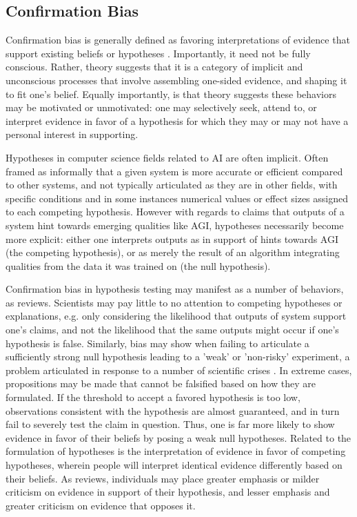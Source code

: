 \documentclass{article}
\theoremstyle{plain}
\theoremstyle{definition}
\theoremstyle{remark}
\begin{document}
\subsection{Confirmation Bias}

Confirmation bias is generally defined as favoring interpretations of evidence that support existing beliefs or hypotheses \cite{nickerson1998confirmation}. Importantly, it need not be fully conscious. Rather, theory suggests that it is a category of implicit and unconscious processes that involve assembling one-sided evidence, and shaping it to fit one's belief. Equally importantly, is that theory suggests these behaviors may be motivated or unmotivated: one may selectively seek, attend to, or interpret evidence in favor of a hypothesis for which they may or may not have a personal interest in supporting. 

Hypotheses in computer science fields related to AI are often implicit. Often framed as informally that a given system is more accurate or efficient compared to other systems, and not typically articulated as they are in other fields, with specific conditions and in some instances numerical values or effect sizes assigned to each competing hypothesis. However with regards to claims that outputs of a system hint towards emerging qualities like AGI, hypotheses necessarily become more explicit: either one interprets outputs as in support of hints towards AGI (the competing hypothesis), or as merely the result of an algorithm integrating qualities from the data it was trained on (the null hypothesis). 

Confirmation bias in hypothesis testing may manifest as a number of behaviors, as \cite{nickerson1998confirmation} reviews. Scientists may pay little to no attention to competing hypotheses or explanations, e.g. only considering the likelihood that outputs of system support one's claims, and not the likelihood that the same outputs might occur if one's hypothesis is false. Similarly, bias may show when failing to articulate a sufficiently strong null hypothesis leading to a 'weak' or 'non-risky' experiment, a problem articulated in response to a number of scientific crises \cite{claesen2022severity}. In extreme cases, propositions may be made that cannot be falsified based on how they are formulated. If the threshold to accept a favored hypothesis is too low, observations consistent with the hypothesis are almost guaranteed, and in turn fail to severely test the claim in question. Thus, one is far more likely to show evidence in favor of their beliefs by posing a weak null hypotheses. Related to the formulation of hypotheses is the interpretation of evidence in favor of competing hypotheses, wherein people will interpret identical evidence differently based on their beliefs. As \cite{nickerson1998confirmation} reviews, individuals may place greater emphasis or milder criticism on evidence in support of their hypothesis, and lesser emphasis and greater criticism on evidence that opposes it. 
\end{document}
